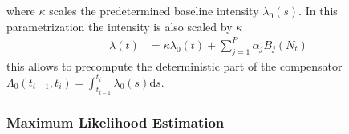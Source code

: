 \documentclass{amsart}
\newcommand{\mathd}{\mathrm{d}}
\begin{document}
where $\kappa$ scales the predetermined baseline intensity $\lambda_0 ( s)$.
In this parametrization the intensity is also scaled by $\kappa$
\begin{equation}
  \begin{array}{ll}
    \lambda ( t) & = \kappa \lambda_0 ( t) + \sum_{j = 1}^P \alpha_j B_j (
    N_t)
  \end{array}
\end{equation}
this allows to precompute the deterministic part of the compensator $\Lambda_0
( t_{i - 1}, t_i) = \int_{t_{i - 1}^{}}^{t_i} \lambda_0 ( s) \mathd s$.

\subsubsection{Maximum Likelihood Estimation}
\end{document}
